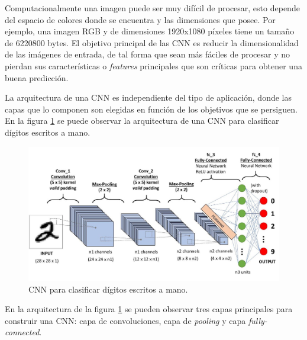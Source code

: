 Computacionalmente una imagen puede ser muy difícil de procesar, esto depende del espacio de colores donde se encuentra \cite{cnn_colors} y las dimensiones que posee. Por ejemplo, una imagen RGB y de dimensiones 1920x1080 píxeles tiene un tamaño de 6220800 bytes. El objetivo principal de las CNN es reducir la dimensionalidad de las imágenes de entrada, de tal forma que sean más fáciles de procesar y no pierdan sus características o \textit{features} principales que son críticas para obtener una buena predicción.

La arquitectura de una CNN es independiente del tipo de aplicación, donde las capas que lo componen son elegidas en función de los objetivos que se persiguen. En la figura \ref{fig:cnn_arch} se puede observar la arquitectura de una CNN para clasificar dígitos escritos a mano.

\begin{figure}[h]
	\centering
	\includegraphics[scale=0.35]{./Figures/cnn_arch.jpeg}
	\caption{CNN para clasificar dígitos escritos a mano\protect\footnotemark.}
	\label{fig:cnn_arch}
\end{figure}

En la arquitectura de la figura \ref{fig:cnn_arch} se pueden observar tres capas principales para construir una CNN: capa de convoluciones, capa de \textit{pooling} y capa \textit{fully-connected}.

